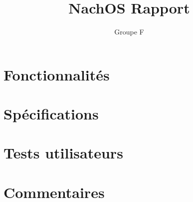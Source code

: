 \documentclass{report}
\title{NachOS Rapport}
\author{Groupe F}
\begin{document}
\maketitle
\chapter{Fonctionnalités}
\chapter{Spécifications}
\chapter{Tests utilisateurs}
\chapter{Commentaires}
\end{document}
